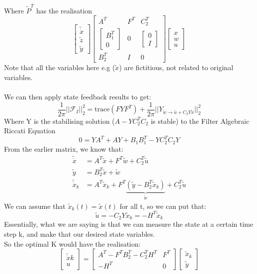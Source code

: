 \documentclass{article}
\begin{document}
Where $\tilde P^T$ has the realisation
\[
\begin{bmatrix}
     \tilde{\dot x} \\ \tilde z \\ \tilde y
\end{bmatrix}
 \begin{bmatrix}
    A^T & F^T
    & 
    C_2^T \\
    \begin{bmatrix}
        B_1^T \\ 0
    \end{bmatrix}
    & 0 & \begin{bmatrix}
        0 \\ I
    \end{bmatrix} \\
    B_2^T & I
    & 0
\end{bmatrix}
\begin{bmatrix}
    x \\ w \\ u
\end{bmatrix}
\]
Note that all the variables here e.g ($\tilde x$) are fictitious, not related to original variables. \\ \\
We can then apply state feedback results to get:
\[
\frac{1}{2 \pi} ||\mathcal{F}_I||_2^2 = \text{trace}(FYF^T) + \frac{1}{2 \pi} ||Y_{\tilde w \rightarrow \tilde u + C_2 Y \tilde x}||_2^2
\]
Where Y is the stabilising solution ($A - YC_2^TC_2$ is stable) to the Filter Algebraic Riccati Equation
\begin{equation}\label{fare}
    0 = YA^T + AY + B_1B_1^T - YC_2^TC_2Y
\end{equation}
From the earlier matrix, we know that:
\[
\begin{aligned}
\tilde{\dot x} &= A^T \tilde x + F^T \tilde w + C_2^T \tilde u  \\
\tilde y &= B_2^T \tilde x + \tilde w \\
\tilde{\dot x}_k &= A^T \tilde x_k + F^T \underbrace{( \tilde y - B_2^T \tilde x_k)}_{\tilde w} + C_2^T \tilde u
\end{aligned} 
\]
We can assume that $\tilde x_k(t) = \tilde x(t)$ for all t, so we can put that:
\[
\tilde u = -C_2 Y \tilde x_k = -H^T \tilde x_k
\]
Essentially, what we are saying is that we can measure the state at a certain time step k, and make that our desired state variables. \\
So the optimal K would have the realisation:
\[
\begin{bmatrix}
    \tilde{\dot x} k \\ u
\end{bmatrix}
= \begin{bmatrix}
    A^T - F^TB_2^T - C_2^TH^T & F^T \\
    -H^T & 0
\end{bmatrix}
\begin{bmatrix}
    \tilde x_k \\ \tilde y
\end{bmatrix}
\]
\end{document}
